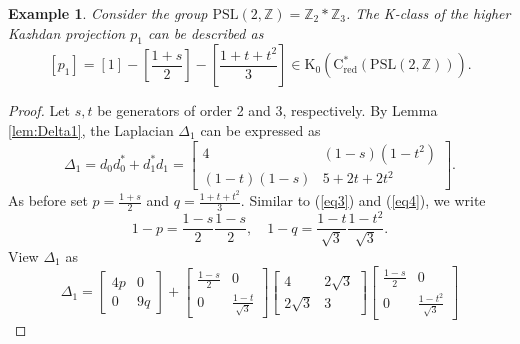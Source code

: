 \documentclass[a4paper,leqno,12pt]{article}
\numberwithin{equation}{section}
\theoremstyle{plain}
\newtheorem{example}[theoremcounter]{Example}
\theoremstyle{definition}
\theoremstyle{remark}
\newcommand{\Csr}{\mathrm{C}^*_{\text{red}}}
\begin{document}
	\begin{example}
		\label{example:PSL(2,Z)}
		Consider the group $\mathrm{PSL}(2, \mathbb Z) = \mathbb Z_2 \ast \mathbb Z_3$. The K-class of the higher Kazhdan projection $p_1$ can be described as
		\[
		[p_1] = [1]-\left[\frac{1+s}{2}\right]-\left[\frac{1+t+t^2}{3}\right]\in \mathrm K_0(
		\Csr(\mathrm{PSL}(2, \mathbb Z))).
		\]
	\end{example}
	
	\begin{proof}
		Let $s, t$ be generators of order 2 and 3, respectively. 
		By Lemma \ref{lem:Delta1}, the Laplacian $\Delta_1$ can be expressed as
		\[ 
		\Delta_1=d_0d_0^*+d_1^*d_1=
		\begin{bmatrix}4 & (1-s)(1-t^2)\\
			(1-t)(1-s) & 5+2t+2t^2
		\end{bmatrix}.
		\]
		As before set $p=\frac{1+s}{2}$ and $q=\frac{1+t+t^2}{3}$. 
		Similar to (\ref {eq3}) and (\ref{eq4}), we write
		\[
		1-p=\frac{1-s}{2}\frac{1-s}{2}, 
		\quad
		1-q=\frac{1-t}{\sqrt 3}\frac{1-t^2}{\sqrt 3}.
		\]
		View $\Delta_1$ as
		\[
		\Delta_1
		=
		\begin{bmatrix}4p & 0\\0 & 9q \end{bmatrix}
		+
		\begin{bmatrix} 
			\frac{1-s}{2} & 0 \\ 0 & \frac{1-t}{\sqrt 3}
		\end{bmatrix}
		\begin{bmatrix}
			4 & 2\sqrt 3 \\ 2\sqrt 3 & 3
		\end{bmatrix}
		\begin{bmatrix}\frac{1-s}{2} & 0 \\ 0 & \frac{1-t^2}{\sqrt 3}

\end{bmatrix}\]
\end{proof}
\end{document}
